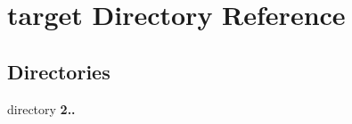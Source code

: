 \section{target Directory Reference}
\label{dir_1bbcb9615bce09de8292fb64e7b04403}
\subsection*{Directories}
\begin{DoxyCompactItemize}
\item 
directory \textbf{ 2..}
\end{DoxyCompactItemize}
